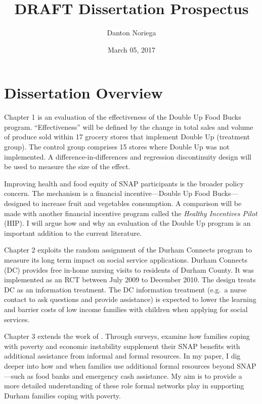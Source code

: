 \documentclass[12pt,letterpaperpaper,]{book}
\title{DRAFT Dissertation Prospectus}
\author{Danton Noriega}
\date{March 05, 2017}
\begin{document}
\maketitle

\setlength{\abovedisplayskip}{-5pt}
\setlength{\abovedisplayshortskip}{-5pt}
\mainmatter

{
\setcounter{tocdepth}{2}
\tableofcontents
}
\chapter*{Dissertation Overview}\label{dissertation-overview}

Chapter 1 is an evaluation of the effectiveness of the Double Up Food
Bucks program. ``Effectiveness'' will be defined by the change in total
sales and volume of produce sold within 17 grocery stores that implement
Double Up (treatment group). The control group comprises 15 stores where
Double Up was not implemented. A difference-in-differences and
regression discontinuity design will be used to measure the size of the
effect.

Improving health and food equity of SNAP participants is the broader
policy concern. The mechanism is a financial incentive---Double Up Food
Bucks---designed to increase fruit and vegetables consumption. A
comparison will be made with another financial incentive program called
the \emph{Healthy Incentives Pilot} (HIP). I will argue how and why an
evaluation of the Double Up program is an important addition to the
current literature.

Chapter 2 exploits the random assignment of the Durham Connects program
to measure its long term impact on social service applications. Durham
Connects (DC) provides free in-home nursing visits to residents of
Durham County. It was implemented as an RCT between July 2009 to
December 2010. The design treats DC as an information treatment. The DC
information treatment (e.g.~a nurse contact to ask questions and provide
assistance) is expected to lower the learning and barrier costs of low
income families with children when applying for social services.

Chapter 3 extends the work of \citet{schenck-fontaine_use_2016}. Through
surveys, \citet{schenck-fontaine_use_2016} examine how families coping
with poverty and economic instability supplement their SNAP benefits
with additional assistance from informal and formal resources. In my
paper, I dig deeper into how and when families use additional formal
resources beyond SNAP---such as food banks and emergency cash
assistance. My aim is to provide a more detailed understanding of these
role formal networks play in supporting Durham families coping with
poverty.
\end{document}
